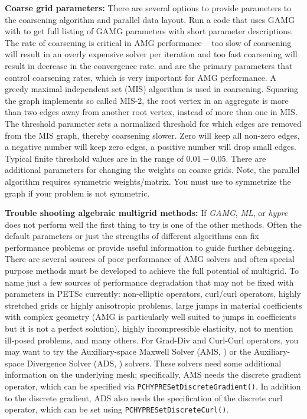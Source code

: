 {\bf Coarse grid parameters:} There are several options to provide parameters to the coarsening algorithm and parallel data layout.
Run a code that uses GAMG with  to get full listing of GAMG parameters with short parameter descriptions.
The rate of coarsening is critical in AMG performance -- too slow of coarsening will result in an overly expensive solver per iteration and too fast coarsening will result in decrease in the convergence rate.  and   are the primary parameters that control coarsening rates, which is very important for AMG performance.
A greedy maximal independent set (MIS) algorithm is used in coarsening.
Squaring the graph implements so called MIS-2, the root vertex in an aggregate is more than two edges away from another root vertex, instead of more than one in MIS.
The threshold parameter sets a normalized threshold for which edges are removed from the MIS graph, thereby coarsening slower.
Zero will keep all non-zero edges, a negative number will keep zero edges, a positive number will drop small edges.
Typical finite threshold values are in the range of $0.01 - 0.05$.
There are additional parameters for changing the weights on coarse grids.
Note, the parallel algorithm requires symmetric weights/matrix.
You must use  to symmetrize the graph if your problem is not symmetric.

{\bf Trouble shooting algebraic multigrid methods:}
If {\it GAMG}, {\it ML}, or {\it hypre} does not perform well the first thing to try is one of
the other methods. Often the default parameters or just the strengths of different algorithms can fix performance problems or provide useful information to guide further debugging.
There are several sources of poor performance of
AMG solvers and often special purpose methods must be developed to
achieve the full potential of multigrid.
To name just a few sources of performance degradation that
may not be fixed with parameters in PETSc currently: non-elliptic
operators, curl/curl operators, highly stretched grids or highly anisotropic problems,
large jumps in material coefficients with complex geometry (AMG is
particularly well suited to jumps in coefficients but it is not a
perfect solution), highly incompressible elasticity, not to mention
ill-posed problems, and many others. For Grad-Div and Curl-Curl operators,
you may want to try the Auxiliary-space Maxwell Solver (AMS, )
or the Auxiliary-space Divergence Solver (ADS, ) solvers.
These solvers need some additional information on the underlying mesh;
specifically, AMS needs the discrete gradient operator, which can be specified via
\lstinline{PCHYPRESetDiscreteGradient()}. In addition to the discrete gradient, ADS also needs the
specification of the discrete curl operator, which can be set using \lstinline{PCHYPRESetDiscreteCurl()}.

